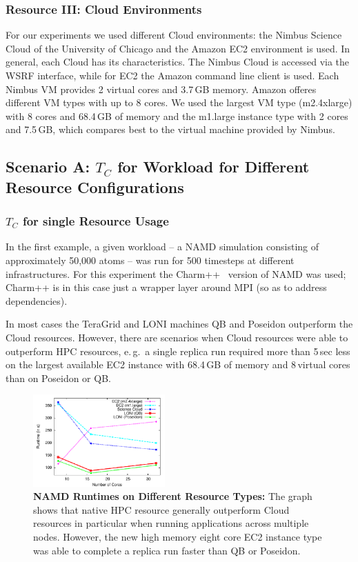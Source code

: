 \documentclass[conference,final]{IEEEtran}
\newcommand{\up}{\vspace*{-1em}}
\newcommand{\tc}{$T_{C}$ }
\begin{document}
\subsubsection*{Resource III: Cloud Environments}

For our experiments we used different Cloud environments: 
the Nimbus Science Cloud of the University of Chicago and the 
Amazon EC2 environment is used. In general, each Cloud has 
its characteristics. The Nimbus Cloud is accessed via the WSRF
interface, while for EC2 the Amazon command line 
client is used. Each Nimbus VM provides 2 virtual cores and 3.7\,GB memory. 
Amazon offeres different VM types with up to 8 cores. We used 
the largest VM type (m2.4xlarge) with 8 cores and 68.4\,GB of memory
and the m1.large instance type with 2 cores and 7.5\,GB, which compares
best to the virtual machine provided by Nimbus. 

\subsection{Scenario A: \tc for Workload for Different Resource
  Configurations}
\up

\subsubsection{\tc for single Resource Usage}

In the first example, a given workload -- a NAMD simulation consisting
of approximately 50,000 atoms -- was run for 500 timesteps at different
infrastructures. For this experiment the Charm++~\cite{871085} version
of NAMD was used; Charm++ is in this case just a wrapper layer around
MPI (so as to address dependencies).

In most cases the TeraGrid and LONI machines QB and Poseidon
outperform the Cloud resources.  However, there are scenarios when
Cloud resources were able to outperform HPC resources, e.\,g.\ a
single replica run required more than 5\,sec less on the largest
available EC2 instance with 68.4\,GB of memory and 8\,virtual cores
than on Poseidon or QB.

\begin{figure}[htbp]
    \centering
    \includegraphics[width=0.45\textwidth]{performance/namd_run.pdf}
    \caption{\textbf{NAMD Runtimes on Different Resource Types: } The
      graph shows that native HPC resource generally outperform Cloud
      resources in particular when running applications across
      multiple nodes. However, the new high memory eight core EC2
      instance type was able to complete a replica run faster than QB
      or Poseidon.}
    \label{fig:performance_namd_run}
\end{figure}
\end{document}
